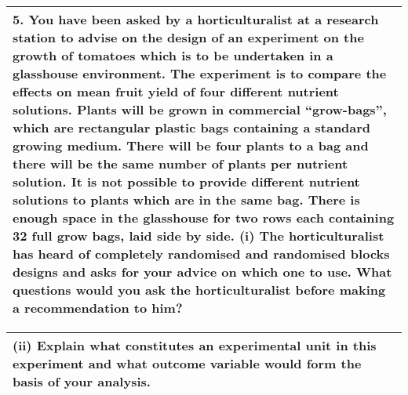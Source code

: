 \documentclass[a4paper,12pt]{article}
\begin{document}
\begin{table}[ht!]
 \centering
 \begin{tabular}{|p{15cm}|}
 \hline  
5. You have been asked by a horticulturalist at a research station to advise on the design of an experiment on the growth of tomatoes which is to be undertaken in a glasshouse environment. The experiment is to compare the effects on mean fruit yield of four different nutrient solutions. Plants will be grown in commercial “grow-bags”, which are rectangular plastic bags containing a standard growing medium. There will be four plants to a bag and there will be the same number of plants per nutrient solution. It is not possible to provide different nutrient solutions to plants which are in the same bag. There is enough space in the glasshouse for two  rows each containing 32 full grow bags, laid side by side.
(i) The horticulturalist has heard of completely randomised and randomised blocks designs and asks for your advice on which one to use. What questions would you ask the horticulturalist before making a recommendation to him?


\\ \hline
  \end{tabular}
\end{table}
\begin{table}[ht!]
 \centering
 \begin{tabular}{|p{15cm}|}
 \hline  
(ii) Explain what constitutes an experimental unit in this experiment and what outcome variable  would form the basis of your analysis.\\ \hline
  \end{tabular}
\end{table}
\end{document}
